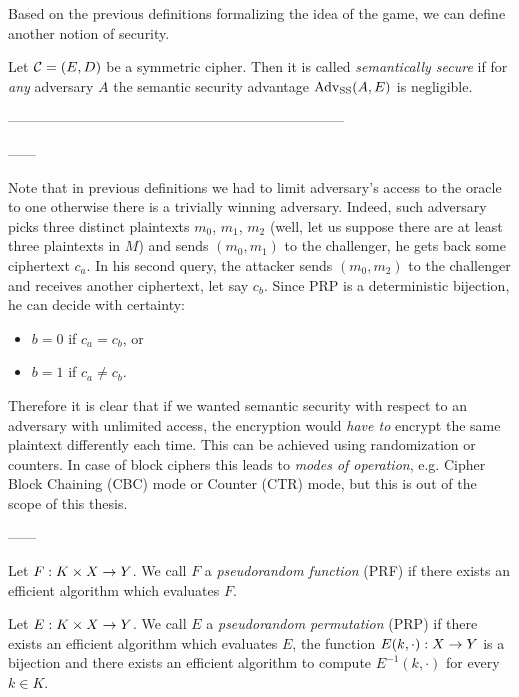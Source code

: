 Based on the previous definitions formalizing the idea of the game, we can define another notion of security.

\begin{defn}
\label{def:semsec}
	Let ${\cal C} = (E,D)$ be a symmetric cipher. Then it is called {\em semantically secure} if for {\em any} adversary $A$ the semantic security advantage $\operatorname*{Adv_{SS}}(A,E)$ is negligible.
\end{defn}

------------------------------------------------------------------------

------
\begin{note}
	Note that in previous definitions we had to limit adversary's access to the oracle to one otherwise there is a trivially winning adversary. Indeed, such adversary picks three distinct plaintexts $m_0$, $m_1$, $m_2$ (well, let us suppose there are at least three plaintexts in $M$) and sends $(m_0,m_1)$ to the challenger, he gets back some ciphertext $c_a$. In his second query, the attacker sends $(m_0,m_2)$ to the challenger and receives another ciphertext, let say $c_b$. Since PRP is a deterministic bijection, he can decide with certainty:
	\begin{itemize}
		\item $b=0$ if $c_a = c_b$, or
		\item $b=1$ if $c_a \neq c_b$.
	\end{itemize}
	
	Therefore it is clear that if we wanted semantic security with respect to an adversary with unlimited access, the encryption would {\em have to} encrypt the same plaintext differently each time. This can be achieved using randomization or counters. In case of block ciphers this leads to {\em modes of operation}, e.g. Cipher Block Chaining (CBC) mode or Counter (CTR) mode, but this is out of the scope of this thesis.
\end{note}
------



\begin{defn}   %
	Let $F: K\times X\rightarrow Y$. We call $F$ a {\em pseudorandom function} (PRF) if there exists an efficient algorithm which evaluates $F$.
\end{defn}

\begin{defn}
	Let $E: K\times X\rightarrow Y$. We call $E$ a {\em pseudorandom permutation} (PRP) if there exists an efficient algorithm which evaluates $E$, the function $E(k,\cdot): X\rightarrow Y$ is a bijection and there exists an efficient algorithm to compute $E^{-1}(k,\cdot)$ for every $k\in K$.
\end{defn}

